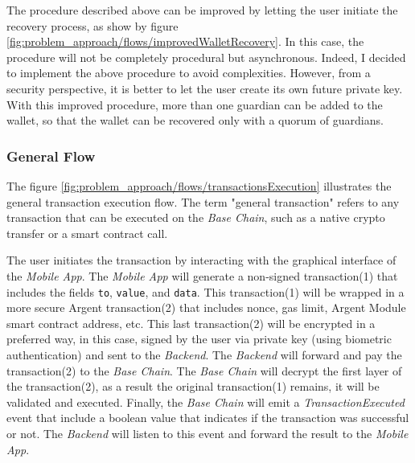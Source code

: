
The procedure described above can be improved by letting the user initiate the recovery process, as show by figure \ref{fig:problem_approach/flows/improvedWalletRecovery}. In this case, the procedure will not be completely procedural but asynchronous. Indeed, I decided to implement the above procedure to avoid complexities. However, from a security perspective, it is better to let the user create its own future private key. With this improved procedure, more than one guardian can be added to the wallet, so that the wallet can be recovered only with a quorum of guardians.

\subsubsection{General Flow}
\label{subsubsec:transactionsExecution}

The figure \ref{fig:problem_approach/flows/transactionsExecution} illustrates the general transaction execution flow. The term "general transaction" refers to any transaction that can be executed on the \textit{Base Chain}, such as a native crypto transfer or a smart contract call. 

The user initiates the transaction by interacting with the graphical interface of the \textit{Mobile App}. The \textit{Mobile App} will generate a non-signed transaction(1) that includes the fields \texttt{to}, \texttt{value}, and \texttt{data}. This transaction(1) will be wrapped in a more secure Argent transaction(2) that includes nonce, gas limit, Argent Module smart contract address, etc. This last transaction(2) will be encrypted in a preferred way, in this case, signed by the user via private key (using biometric authentication) and sent to the \textit{Backend}. The \textit{Backend} will forward and pay the transaction(2) to the \textit{Base Chain}. The \textit{Base Chain} will decrypt the first layer of the transaction(2), as a result the original transaction(1) remains, it will be validated and executed. Finally, the \textit{Base Chain} will emit a \textit{TransactionExecuted} event that include a boolean value that indicates if the transaction was successful or not. The \textit{Backend} will listen to this event and forward the result to the \textit{Mobile App}.

